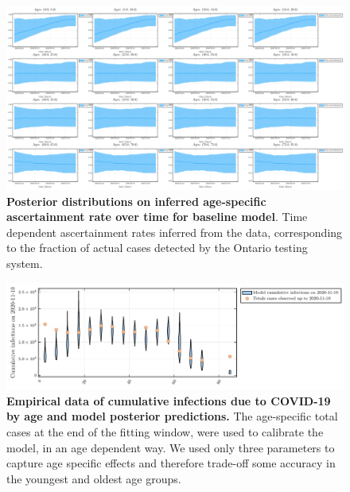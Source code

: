     \begin{figure}[H]
    \centering
    \includegraphics[width = 18 cm]{appendices/FigureS3.pdf}
    \caption{\textbf{Posterior distributions on inferred age-specific ascertainment rate over time for baseline model}. Time dependent ascertainment rates inferred from the data, corresponding to the fraction of actual cases detected by the Ontario testing system. }
    \label{plot_model}
    \end{figure}
    
    \clearpage 
    
    \begin{figure}[H]
    \centering
    \includegraphics[width = 12 cm]{appendices/FigureS4.pdf}
    \caption{\textbf{Empirical data of cumulative infections due to COVID-19 by age and model posterior predictions.} The age-specific total cases at the end of the fitting window, were used to calibrate the model, in an age dependent way. We used only three parameters to capture age specific effects and therefore trade-off some accuracy in the youngest and oldest age groups.}
    \label{plot_model}
    \end{figure}
    
    \clearpage 
    
